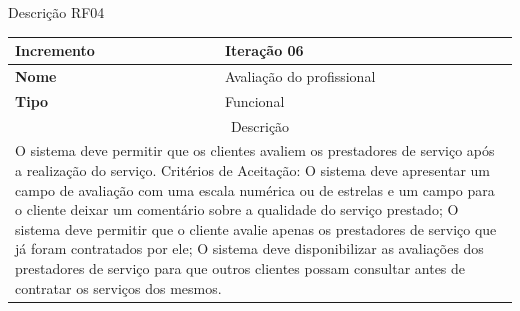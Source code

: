 \clearpage
\begin{quadro}[htb]
	\centering
	\caption{\label{Formatação do texto.}Descrição RF04}	
	\begin{tabular}{|l|p{11cm}|}
		\hline
		\textbf{Incremento}    & Iteração 06\\ \hline
		\textbf{Nome}    & Avaliação do profissional\\ \hline
		\textbf{Tipo}    & Funcional\\ \hline
		\multicolumn{2}{|c|}{Descrição}\\ \hline
		\multicolumn{2}{|p{12cm}|}{
			O sistema deve permitir que os clientes avaliem os prestadores de serviço após a realização do serviço. \newline
			\newline Critérios de Aceitação: \newline
			O sistema deve apresentar um campo de avaliação com uma escala numérica ou de estrelas e um campo para o cliente deixar um comentário sobre a qualidade do serviço prestado; \newline
			\newline O sistema deve permitir que o cliente avalie apenas os prestadores de serviço que já foram contratados por ele; \newline
			\newline O sistema deve disponibilizar as avaliações dos prestadores de serviço para que outros clientes possam consultar antes de contratar os serviços dos mesmos.
			} \\ \hline
	\end{tabular}
\end{quadro}

